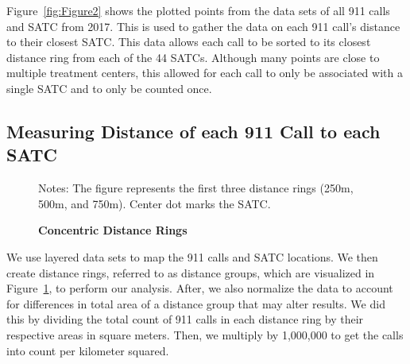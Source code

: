 \documentclass[12pt]{article}
\begin{document}
Figure~\ref{fig:Figure2} shows the plotted points from the data sets of all 911 calls and SATC from 2017. This is used to gather the data on each 911 call's distance to their closest SATC. This data allows each call to be sorted to its closest distance ring from each of the 44 SATCs. Although many points are close to multiple treatment centers, this allowed for each call to only be associated with a single SATC and to only be counted once.



\subsection{Measuring Distance of each 911 Call to each SATC}
 


\begin{figure} 
\caption{\textbf{Concentric Distance Rings}}
\label{fig:Figure1}
\small{Notes: The figure represents the first three distance rings (250m, 500m, and 750m). Center dot marks the SATC.}
\end{figure}

We use layered data sets to map the 911 calls and SATC locations. We then create distance rings, referred to as distance groups, which are visualized in Figure~\ref{fig:Figure1}, to perform our analysis. After, we also normalize the data to account for differences in total area of a distance group that may alter results. We did this by dividing the total count of 911 calls in each distance ring by their respective areas in square meters. Then, we multiply by 1,000,000 to get the calls into count per kilometer squared.
\end{document}
